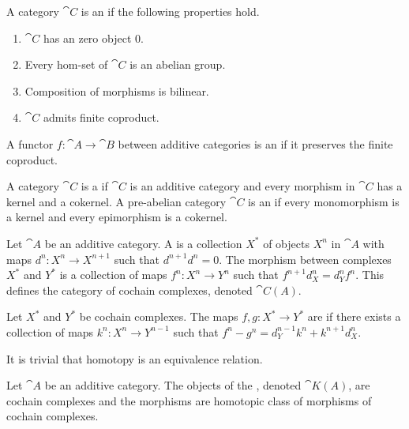 \begin{definition}
    A category $\cat{C}$ is an  if the following properties hold.
    \begin{enumerate}
        \item $\cat{C}$ has an zero object $0$.
        \item Every hom-set of $\cat{C}$ is an abelian group.
        \item Composition of morphisms is bilinear.
        \item $\cat{C}$ admits finite coproduct.
    \end{enumerate}
\end{definition}
\begin{definition}
    A functor $f:\cat{A}\to\cat{B}$ between additive categories is an  if it preserves the finite coproduct.
\end{definition}
\begin{definition}
    A category $\cat{C}$ is a  if $\cat{C}$ is an additive category and every morphism in $\cat{C}$ has a kernel and a cokernel. A pre-abelian category $\cat{C}$ is an  if every monomorphism is a kernel and every epimorphism is a cokernel.
\end{definition}
\begin{definition}
    Let $\cat{A}$ be an additive category. A  is a collection ${X}^{*}$ of objects ${X}^{n}$ in $\cat{A}$ with maps ${d}^{n}:{X}^{n}\to{X}^{n+1}$ such that ${d}^{n+1}{d}^{n}=0$. The morphism between complexes ${X}^{*}$ and ${Y}^{*}$ is a collection of maps ${f}^{n}:{X}^{n}\to{Y}^{n}$ such that ${f}^{n+1}{d}_{X}^{n}={d}_{Y}^{n}{f}^{n}$. This defines the category of cochain complexes, denoted $\cat{C(A)}$.
\end{definition}
\begin{definition}
    Let ${X}^{*}$ and ${Y}^{*}$ be cochain complexes. The maps $f,g:{X}^{*}\to{Y}^{*}$ are  if there exists a collection of maps ${k}^{n}:{X}^{n}\to{Y}^{n-1}$ such that ${f}^{n}-{g}^{n}={d}_{Y}^{n-1}{k}^{n}+{k}^{n+1}{d}_{X}^{n}$.
\end{definition}
\par
It is trivial that homotopy is an equivalence relation.
\begin{definition}
    Let $\cat{A}$ be an additive category. The objects of the , denoted $\cat{K(A)}$, are cochain complexes and the morphisms are homotopic class of morphisms of cochain complexes.
\end{definition}
